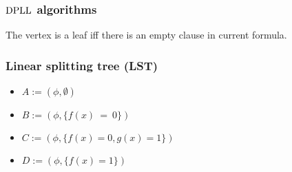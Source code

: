 \begin{frame}
	\frametitle{$\mathrm{DPLL}$ algorithms}

    \begin{center}
    	    
    \end{center}
    
	\pause
    \pause
    \pause
    \pause
    \pause

    The vertex is a leaf iff there is an empty clause in current formula.

\end{frame}


\begin{frame}
	\frametitle{Linear splitting tree (LST)}

    \begin{center}
    	    
    \end{center}

    \vspace{0.1cm}
    
    \begin{minipage}{0.42\linewidth}
        \begin{itemize}
            \item<1-> $A := (\phi, \emptyset)$
	    	\item<2-> $B := (\phi, \{f(x)~=~0\})$
        \end{itemize}
    \end{minipage}
    \begin{minipage}{0.55\linewidth}
        \begin{itemize}
            \item<4-> $C := (\phi, \{f(x) = 0, g(x) = 1\})$
        	\item<5-> $D := (\phi, \{f(x) = 1\})$
        \end{itemize}
    \end{minipage}
    
	\pause
    \pause
    \pause
    \pause

\end{frame}


